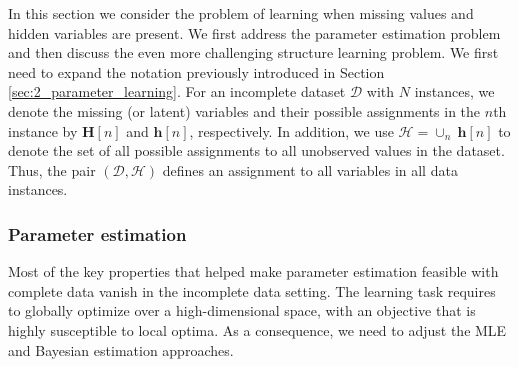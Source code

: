 In this section we consider the problem of learning when missing values and hidden variables are present. We first address the parameter estimation problem and then discuss the even more challenging structure learning problem. We first need to expand the notation previously introduced in Section \ref{sec:2_parameter_learning}. For an incomplete dataset $\mathcal{D}$ with $N$ instances, we denote the missing (or latent) variables and their possible assignments in the $n$th instance by $\mathbf{H}[n]$ and $\mathbf{h}[n]$, respectively. In addition, we use $\mathcal{H} = \cup_{n} \ \mathbf{h}[n]$ to denote the set of all possible assignments to all unobserved values in the dataset. Thus, the pair $(\mathcal{D}, \mathcal{H})$ defines an assignment to all variables in all data instances.


\subsubsection{Parameter estimation} \label{sec:2_parameter_learning_incomplete}

Most of the key properties that helped make parameter estimation feasible with complete data vanish in the incomplete data setting. The learning task requires to globally optimize over a high-dimensional space, with an objective that is highly susceptible to local optima. As a consequence, we need to adjust the MLE and Bayesian estimation approaches.

